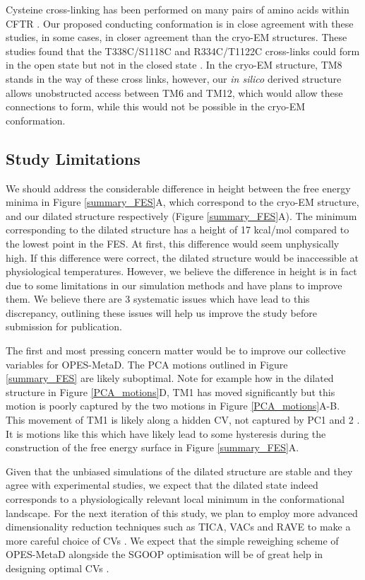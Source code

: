 Cysteine cross-linking has been performed on many pairs of amino acids within CFTR \cite{negoda2019}. Our proposed conducting conformation is in close agreement with these studies, in some cases, in closer agreement than the cryo-EM structures. These studies found that the T338C/S1118C and R334C/T1122C cross-links could form in the open state but not in the closed state \cite{wang2012}. In the cryo-EM structure, TM8 stands in the way of these cross links, however, our \textit{in silico} derived structure allows unobstructed access between TM6 and TM12, which would allow these connections to form, while this would not be possible in the cryo-EM conformation.

\subsection{Study Limitations}

We should address the considerable difference in height between the free energy minima in Figure \ref{summary_FES}A, which correspond to the cryo-EM structure, and our dilated structure respectively (Figure \ref{summary_FES}A). The minimum corresponding to the dilated structure has a height of 17 kcal/mol compared to the lowest point in the FES. At first, this difference would seem unphysically high. If this difference were correct, the dilated structure would be inaccessible at physiological temperatures. However, we believe the difference in height is in fact due to some limitations in our simulation methods and have plans to improve them. We believe there are 3 systematic issues which have lead to this discrepancy, outlining these issues will help us improve the study before submission for publication. 

The first and most pressing concern matter would be to improve our collective variables for OPES-MetaD. The PCA motions outlined in Figure \ref{summary_FES} are likely suboptimal. Note for example how in the dilated structure in Figure \ref{PCA_motions}D, TM1 has moved significantly but this motion is poorly captured by the two motions in Figure \ref{PCA_motions}A-B. This movement of TM1 is likely along a hidden CV, not captured by PC1 and 2 \cite{bussi2015, bussi2020a}. It is motions like this which have likely lead to some hysteresis during the construction of the free energy surface in Figure \ref{summary_FES}A. 

Given that the unbiased simulations of the dilated structure are stable and they agree with experimental studies, we expect that the dilated state indeed corresponds to a physiologically relevant local minimum in the conformational landscape. For the next iteration of this study, we plan to employ more advanced dimensionality reduction techniques such as TICA, VACs and RAVE to make a more careful choice of CVs \cite{brotzakis2019, noe2001, schultze2021, brotzakis2019, ribeiro2018} . We expect that the simple reweighing scheme of OPES-MetaD alongside the SGOOP optimisation will be of great help in designing optimal CVs \cite{invernizzi2020, invernizzi2022, smith2018, tiwary2016b}. 

